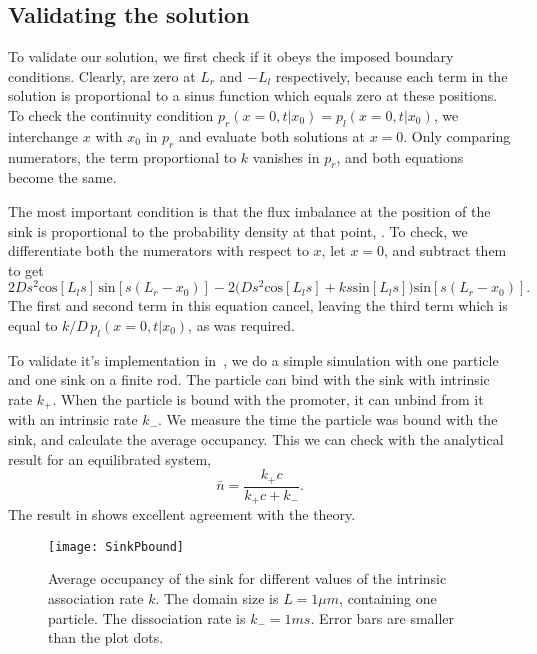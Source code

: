 \subsection{Validating the solution}
To validate our solution, we first check if it obeys the imposed boundary conditions. Clearly,  are zero at $L_r$ and $-L_l$ respectively, because each term in the solution is proportional to a sinus function which equals zero at these positions. To check the continuity condition $p_r(x=0,t|x_0)=p_l(x=0,t|x_0)$, we interchange $x$ with $x_0$ in $p_r$ and evaluate both solutions at $x=0$. Only comparing numerators, the term proportional to $k$ vanishes in $p_r$, and both equations become the same. 

The most important condition is that the flux imbalance at the position of the sink is proportional to the probability density at that point, . To check, we differentiate both the numerators with respect to $x$, let $x=0$, and subtract them to get
\begin{equation}
 2 D s^2 \mathrm{cos}[L_l s] \, \mathrm{sin}[s (L_r-x_0)]-2 \Big(D s^2 \mathrm{cos}[L_l s]+k s \mathrm{sin}[L_l s]\Big) \mathrm{sin}[s (L_r-x_0)].
\end{equation}
The first and second term in this equation cancel, leaving the third term which is equal to $k/D \, p_l(x=0,t|x_0)$, as was required. 

To validate it's implementation in \GFRD\,, we do a simple simulation with one particle and one sink on a finite rod. The particle can bind with the sink with intrinsic rate $k_+$. When the particle is bound with the promoter, it can unbind from it with an intrinsic rate $k_-$. We measure the time the particle was bound with the sink, and calculate the average occupancy. This we can check with the analytical result for an equilibrated system,
\begin{equation}
\bar{n} = \frac{k_+ c}{k_+ c + k_-}.
\end{equation}
The result in  shows excellent agreement with the theory.

\begin{figure}[th]
\centering
\texttt{[image: SinkPbound]}
\caption{ Average occupancy of the sink for different values of the intrinsic association rate $k$. The domain size is $L=1\mu m$, containing one particle. The dissociation rate is $k_-=1ms$. Error bars are smaller than the plot dots.}
\end{figure}

